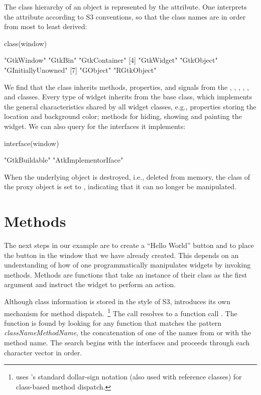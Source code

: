 The class hierarchy of an object is represented by the
 attribute. One interprets the attribute according to S3
conventions, so that the class names are in order from most to least
derived:
\begin{Schunk}
\begin{Sinput}
 class(window)
\end{Sinput}
\end{Schunk}
\begin{Soutput}
[1] "GtkWindow"   "GtkBin"      "GtkContainer"     
[4] "GtkWidget"   "GtkObject"   "GInitiallyUnowned"
[7] "GObject"     "RGtkObject" 
\end{Soutput}
%
We find that the  class inherits methods,
properties, and signals from the , ,
, , , and
 classes. Every type of  widget inherits from
the base  class, which implements the general
characteristics shared by all widget classes, e.g., properties storing
the location and background color; methods for hiding, showing and
painting the widget. We can also query  for the
interfaces it implements:
\begin{Schunk}
\begin{Sinput}
 interface(window)
\end{Sinput}
\begin{Soutput}
[1] "GtkBuildable"        "AtkImplementorIface"
\end{Soutput}
\end{Schunk}

When the underlying \GTK\/ object is destroyed, i.e., deleted
from memory, the class of the proxy object is set to ,
indicating that it can no longer be manipulated.

\section{Methods}

The next steps in our example are to create a ``Hello World'' button
and to place the button in the window that we have already
created. This depends on an understanding of how of one
programmatically manipulates widgets by invoking methods.  Methods are
functions that take an instance of their class as the first argument
and instruct the widget to perform an action.

Although class information is stored in the style of S3, 
introduces its own mechanism for method
dispatch.~\footnote{ uses \R's standard dollar-sign
  notation (also used with reference classes) for class-based method
  dispatch.}  The call   resolves to a function
call . The function is found by looking for any
function that matches the pattern \emph{classNameMethodName}, the
concatenation of one of the names from  or
 with the method name. The search begins with the
interfaces and proceeds through each character vector in order.

